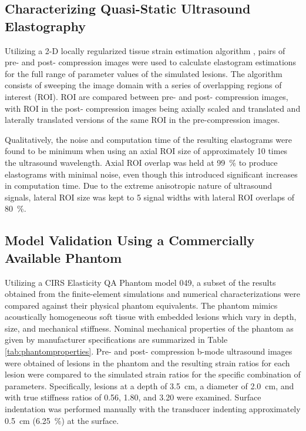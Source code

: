 		\subsection{Characterizing Quasi-Static Ultrasound Elastography}
			\label{sec:elastography_algorithm}
			Utilizing a 2-D locally regularized tissue strain estimation algorithm \cite{brusseau08}, pairs of pre- and post- compression images were used to calculate elastogram estimations for the full range of parameter values of the simulated lesions. The algorithm consists of sweeping the image domain with a series of overlapping regions of interest (ROI). ROI are compared between pre- and post- compression images, with ROI in the post- compression images being axially scaled and translated and laterally translated versions of the same ROI in the pre-compression images.

			Qualitatively, the noise and computation time of the resulting elastograms were found to be minimum when using an axial ROI size of approximately 10 times the ultrasound wavelength. Axial ROI overlap was held at \SI{99}{\percent} to produce elastograms with minimal noise, even though this introduced significant increases in computation time. Due to the extreme anisotropic nature of ultrasound signals, lateral ROI size was kept to 5 signal widths with lateral ROI overlaps of \SI{80}{\percent}.

		\subsection{Model Validation Using a Commercially Available Phantom}
			Utilizing a CIRS Elasticity QA Phantom model 049, a subset of the results obtained from the finite-element simulations and numerical characterizations were compared against their physical phantom equivalents. The phantom mimics acoustically homogeneous soft tissue with embedded lesions which vary in depth, size, and mechanical stiffness. Nominal mechanical properties of the phantom as given by manufacturer specifications are summarized in Table \ref{tab:phantomproperties}. Pre- and post- compression b-mode ultrasound images were obtained of lesions in the phantom and the resulting strain ratios for each lesion were compared to the simulated strain ratios for the specific combination of parameters. Specifically, lesions at a depth of \SI{3.5}{\cm}, a diameter of \SI{2.0}{\cm}, and with true stiffness ratios of 0.56, 1.80, and 3.20 were examined. Surface indentation was performed manually with the transducer indenting approximately \SI{0.5}{\cm} (\SI{6.25}{\percent}) at the surface.

